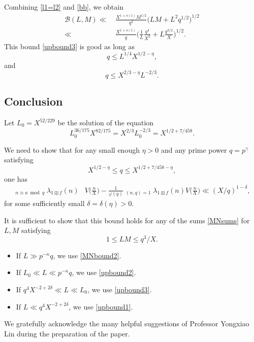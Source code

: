 \documentclass[11pt,reqno]{amsart}
\numberwithin{equation}{section}
\theoremstyle{plain}
\theoremstyle{definition}
\begin{document}
Combining \eqref{l1=l2} and \eqref{bb},
we obtain 
\begin{align}\label{upbound3}
\mathcal{B}(L,M) \ll&\,\frac{X^{1+o(1)}M^{1/2}}{q^2}
\bigl(LM+L^2q^{1/2}\bigr)^{1/2}\nonumber\\
\ll& \,\frac{X^{1+o(1)}}q\bigl(\frac{1}{L}\frac{q^4}{X^2}
+L\frac{q^{3/2}}{X}\bigr)^{1/2}.
\end{align}
This bound \eqref{upbound3} is good as long as
$$q \leq L^{1/4}X^{1/2-\eta},$$ and $$q \leq X^{2/3-\eta}L^{-2/3}.$$


\subsection{Conclusion}

Let $L_0=X^{52/229}$ be the solution of the equation
$$L_0^{36/175}X^{82/175}=X^{2/3}L_0^{-2/3}=X^{1/2+7/458}.$$

We need to show that for any  small enough  $\eta>0$
and any prime power $q=p^\gamma$ satisfying
$$X^{1/2-\eta}\leq q\leq X^{1/2+7/458-\eta},$$ one has
\begin{equation*}
\begin{split}
\mathop{\sum_{n\geq 1}}_{n\equiv a\bmod q}
\lambda_{1\boxplus f}(n)&V\big(\frac{n}{X}\big)
-\frac{1}{\varphi(q)} \mathop{\sum_{n\geq 1}}_{(n,q)=1}
\lambda_{1\boxplus f}(n)V\big(\frac{n}{X}\big)\ll (X/q)^{1-\delta},
\end{split}
\end{equation*}
for some sufficiently small $\delta=\delta(\eta)>0$.

It is sufficient to show that this bound holds for any of the sums
\eqref{MNsums} for $L,M$ satisfying
$$1\leq LM\leq q^3/X.$$
\begin{itemize}
\item[-] If  $L\gg p^{-\kappa}q$, we use \eqref{MNbound2}.
\item[-] If  $L_0\ll L\ll p^{-\kappa}q$, we use \eqref{upbound2}.
\item[-] If  $q^4X^{-2+2\delta}\ll L\ll L_0$, we use \eqref{upbound3}.
\item[-] If $L\ll q^4X^{-2+2\delta}$, we use \eqref{upbound1}.
\end{itemize}

\bigskip

We gratefully acknowledge the many helpful suggestions 
of Professor Yongxiao Lin during the preparation of the paper.
\end{document}
